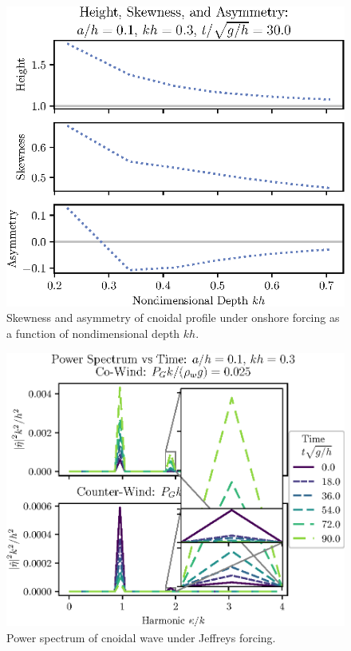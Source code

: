 \documentclass{jfm}
\begin{document}
\begin{figure}
  \centering
  \includegraphics{Skew-Asymm-Cnoidal-kh.eps}
  \caption{
    Skewness and asymmetry of cnoidal profile under onshore forcing as a
    function of nondimensional depth $kh$.
  }
\end{figure}

\begin{figure}
  \centering
  \includegraphics{Power-Spectrum-Jeffreys.eps}
  \caption{
    Power spectrum of cnoidal wave under Jeffreys forcing.
  }
\end{figure}
\end{document}
